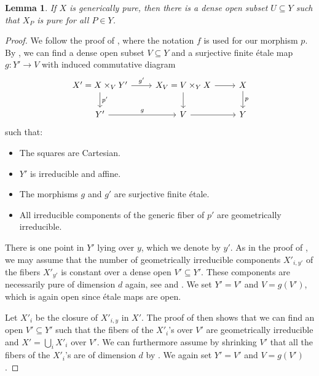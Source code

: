 \documentclass[12pt,reqno,a4paper]{amsart}
\theoremstyle{theoremstyle}
\newtheorem{lemma}[theorem]{Lemma}
\theoremstyle{examplestyle}
\theoremstyle{algorithmstyle}
\begin{document}
\begin{lemma}\label{lem:LemmaPurity}
  If $X$ is generically pure, then there is a dense open subset $U\subseteq{Y}$ such that $X_P$ is pure for all $P\in Y$.
\end{lemma}
\begin{proof}
  We follow the proof of \cite[\href{https://stacks.math.columbia.edu/tag/055A}{Lemma 055A}]{stacks-project}, where the notation $f$ is used for our morphism $p$. %
  By \cite[\href{https://stacks.math.columbia.edu/tag/0551}{Lemma 0551}]{stacks-project}, we can find a dense open subset $V\subseteq Y$ and a surjective finite \'{e}tale map $g\colon Y'\to V$ with induced commutative diagram
  \begin{equation*}
    \begin{tikzcd}
      X'=X\times_{V}Y' \arrow{r}{g'} \arrow{d}{p'}  & X_{V}=V\times_{Y}X \arrow{d}  \arrow{r} & X \arrow{d}{p}\\
      Y' \arrow{r}{g}& V \arrow{r}{} & Y
    \end{tikzcd}
 \end{equation*}
  such that:
  \begin{itemize}
  \item The squares are Cartesian.
  \item $Y'$ is irreducible and affine.
  \item The morphisms $g$ and $g'$ are surjective finite \'{e}tale.
  \item All irreducible components of the generic fiber of $p'$ are geometrically irreducible.
  \end{itemize}
  There is one point in $Y'$ lying over $y$, which we denote by $y'$.
  As in the proof of \cite[\href{https://stacks.math.columbia.edu/tag/055A}{Lemma 055A}]{stacks-project}, we may assume that the number of geometrically irreducible components $X'_{i,y'}$ of the fibers $X'_{y'}$ is constant over a dense open $V'\subseteq Y'$.  These components are necessarily pure of dimension $d$ again, see \cite[\href{https://stacks.math.columbia.edu/tag/04KX}{Lemma 04KX}]{stacks-project} and \cite[\href{https://stacks.math.columbia.edu/tag/07NB}{Section 07NB}]{stacks-project}. We set $Y'=V'$ and $V=g(V')$, which is again open since \'{e}tale maps are open.

  Let $X'_{i}$ be the closure of $X'_{i,y}$ in $X'$.  The proof of \cite[\href{https://stacks.math.columbia.edu/tag/055A}{Lemma 055A}]{stacks-project} then shows that we can find an open $V'\subseteq{Y'}$ such that the fibers of the $X'_{i}$'s over $V'$ are geometrically irreducible and $X'=\bigcup_i X'_{i}$ over $V'$. We can furthermore assume by shrinking $V'$ that all the fibers of the $X'_{i}$'s are of dimension $d$ by \cite[\href{https://stacks.math.columbia.edu/tag/05F7}{Lemma 05F7}]{stacks-project}. We again set $Y'=V'$ and $V=g(V')$.


\end{proof}
\end{document}
